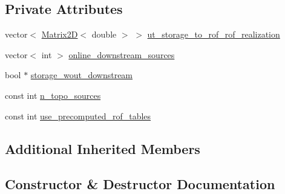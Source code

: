 \subsection*{Private Attributes}
\begin{DoxyCompactItemize}
\item 
vector$<$ \mbox{\hyperlink{classMatrix2D}{Matrix2D}}$<$ double $>$ $>$ \mbox{\hyperlink{classContinuityModelROF_ab4b11938d295e5e74e9cf58725d36a34_ab4b11938d295e5e74e9cf58725d36a34}{ut\+\_\+storage\+\_\+to\+\_\+rof\+\_\+rof\+\_\+realization}}
\item 
vector$<$ int $>$ \mbox{\hyperlink{classContinuityModelROF_a7ab0c5f22272833f309183937fa9d0d8_a7ab0c5f22272833f309183937fa9d0d8}{online\+\_\+downstream\+\_\+sources}}
\item 
bool $\ast$ \mbox{\hyperlink{classContinuityModelROF_ad7ee977c92769377cf6237d2fbf527e3_ad7ee977c92769377cf6237d2fbf527e3}{storage\+\_\+wout\+\_\+downstream}}
\item 
const int \mbox{\hyperlink{classContinuityModelROF_aefffec319cad3a89db2d4c7335ebf2a2_aefffec319cad3a89db2d4c7335ebf2a2}{n\+\_\+topo\+\_\+sources}}
\item 
const int \mbox{\hyperlink{classContinuityModelROF_a384967647c98d9768400de07e2bc7dab_a384967647c98d9768400de07e2bc7dab}{use\+\_\+precomputed\+\_\+rof\+\_\+tables}}
\end{DoxyCompactItemize}
\subsection*{Additional Inherited Members}


\subsection{Constructor \& Destructor Documentation}
\mbox{\label{classContinuityModelROF_a23bd422349e4e2246bd44b2007564fd1_a23bd422349e4e2246bd44b2007564fd1}} 
